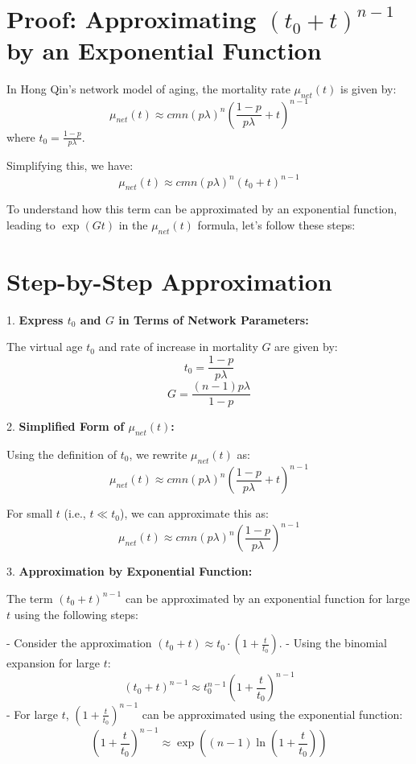 \documentclass{article}
\begin{document}
\section*{\textbf{Proof: Approximating $(t_0 + t)^{n-1}$ by an Exponential Function}}

In Hong Qin's network model of aging, the mortality rate $\mu_{net}(t)$ is given by:
\[
\mu_{net}(t) \approx cmn(p\lambda)^n \left( \frac{1 - p}{p \lambda} + t \right)^{n-1}
\]
where $t_0 = \frac{1 - p}{p \lambda}$.

Simplifying this, we have:
\[
\mu_{net}(t) \approx cmn(p\lambda)^n (t_0 + t)^{n-1}
\]

To understand how this term can be approximated by an exponential function, leading to $\exp(Gt)$ in the $\mu_{net}(t)$ formula, let's follow these steps:

\section*{\textbf{Step-by-Step Approximation}}

1. \textbf{Express $t_0$ and $G$ in Terms of Network Parameters:}

   The virtual age $t_0$ and rate of increase in mortality $G$ are given by:
   \[
   t_0 = \frac{1 - p}{p \lambda}
   \]
   \[
   G = \frac{(n - 1) p \lambda}{1 - p}
   \]

2. \textbf{Simplified Form of $\mu_{net}(t)$:}

   Using the definition of $t_0$, we rewrite $\mu_{net}(t)$ as:
   \[
   \mu_{net}(t) \approx cmn(p\lambda)^n \left( \frac{1 - p}{p \lambda} + t \right)^{n-1}
   \]

   For small $t$ (i.e., $t \ll t_0$), we can approximate this as:
   \[
   \mu_{net}(t) \approx cmn(p\lambda)^n \left( \frac{1 - p}{p \lambda} \right)^{n-1}
   \]

3. \textbf{Approximation by Exponential Function:}

   The term $(t_0 + t)^{n-1}$ can be approximated by an exponential function for large $t$ using the following steps:
   
   - Consider the approximation $(t_0 + t) \approx t_0 \cdot \left(1 + \frac{t}{t_0}\right)$.
   - Using the binomial expansion for large $t$:
     \[
     (t_0 + t)^{n-1} \approx t_0^{n-1} \left(1 + \frac{t}{t_0}\right)^{n-1}
     \]
   - For large $t$, $\left(1 + \frac{t}{t_0}\right)^{n-1}$ can be approximated using the exponential function:
     \[
     \left(1 + \frac{t}{t_0}\right)^{n-1} \approx \exp\left( (n-1) \ln\left(1 + \frac{t}{t_0}\right) \right)
     \]
\end{document}
